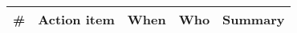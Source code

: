 \begin{longtable}{ccccX}
\toprule
\textbf{\#} & \textbf{Action item} & \textbf{When} & \textbf{Who} & \textbf{Summary} 

\\ \bottomrule
\end{longtable}
